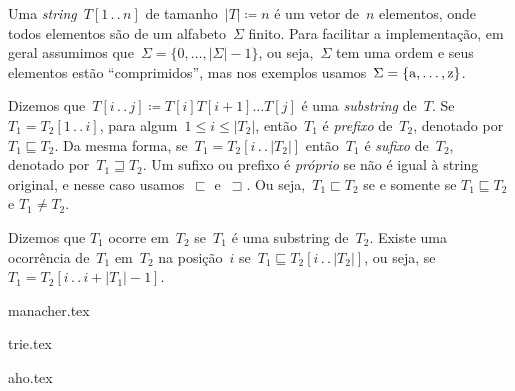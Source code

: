 \documentclass[11pt,oneside,a4paper, openany]{book}
\newcommand{\E}{\Sigma}
\newcommand{\pref}{\sqsubseteq}
\newcommand{\suff}{\sqsupseteq}
\newcommand{\prefp}{\sqsubset}
\newcommand{\suffp}{\sqsupset}
\newcommand{\tdots}{\,.\,.\,} %
\begin{document}
Uma \emph{string}~$T[1\tdots n]$ de tamanho~${|T| \coloneqq n}$ é um vetor de~$n$ elementos, onde todos elementos são de um alfabeto~$\E$ finito. Para facilitar a implementação, em geral assumimos que~${\E = \{0, \ldots, |\E| - 1\}}$, ou seja,~$\E$ tem uma ordem e seus elementos estão ``comprimidos'', mas nos exemplos usamos~${\E = \{\textnormal{a}, \ldots,  \textnormal{z}\}}$.

Dizemos que~${T[i\tdots j] \coloneqq T[i] T[i+1] \ldots T[j]}$ é uma \emph{substring} de~$T$. Se~${T_1 = T_2[1\tdots i]}$, para algum~$1 \leq i \leq |T_2|$, então~$T_1$ é \emph{prefixo} de~$T_2$, denotado por~$T_1 \pref T_2$. Da mesma forma, se~${T_1 = T_2[i\tdots |T_2|]}$ então~$T_1$ é \emph{sufixo} de~$T_2$, denotado por~${T_1 \suff T_2}$.
Um sufixo ou prefixo é \emph{próprio} se não é igual à string original, e nesse caso usamos~$\prefp$ e~$\suffp$. Ou seja,~${T_1 \prefp T_2}$ se e somente se ${T_1 \pref T_2}$ e ${T_1 \neq T_2}$.

Dizemos que $T_1$ ocorre em~$T_2$ se~$T_1$ é uma substring de~$T_2$. Existe uma ocorrência de~$T_1$ em~$T_2$ na posição~$i$ se~${T_1 \pref T_2[i\tdots |T_2|]}$, ou seja, se~${T_1 = T_2[i \tdots i + |T_1| - 1]}$.

\setcounter{secnumdepth}{3}


{manacher.tex}

{trie.tex}

{aho.tex}

\end{document}
